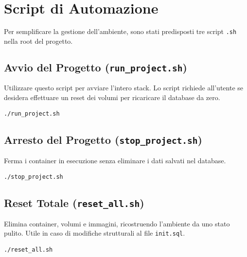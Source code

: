 \section{Script di Automazione}
Per semplificare la gestione dell'ambiente, sono stati predisposti tre script \texttt{.sh} nella root del progetto.

\subsection{Avvio del Progetto (\texttt{run\_project.sh})}
Utilizzare questo script per avviare l'intero stack. Lo script richiede all'utente se desidera effettuare un reset dei volumi per ricaricare il database da zero.
\begin{verbatim}
./run_project.sh
\end{verbatim}

\subsection{Arresto del Progetto (\texttt{stop\_project.sh})}
Ferma i container in esecuzione senza eliminare i dati salvati nel database.
\begin{verbatim}
./stop_project.sh
\end{verbatim}

\subsection{Reset Totale (\texttt{reset\_all.sh})}
Elimina container, volumi e immagini, ricostruendo l'ambiente da uno stato pulito. Utile in caso di modifiche strutturali al file \texttt{init.sql}.
\begin{verbatim}
./reset_all.sh
\end{verbatim}

